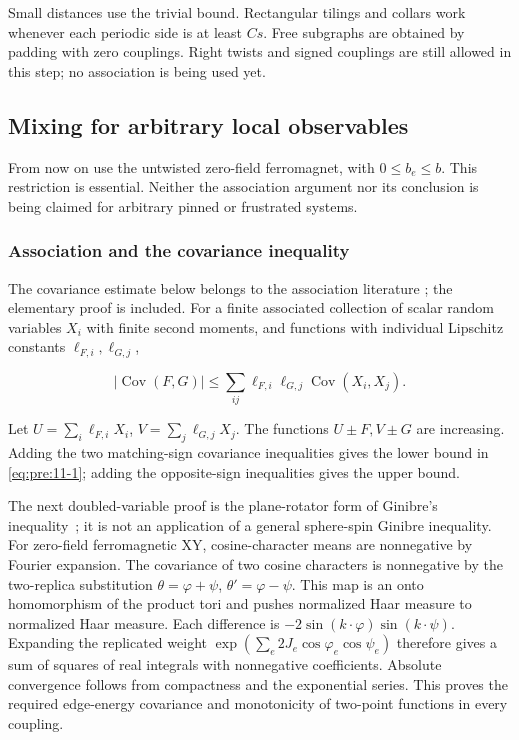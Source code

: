 Small distances use the trivial bound. Rectangular tilings and collars work whenever each periodic side is at least \(Cs\). Free subgraphs are obtained by padding with zero couplings. Right twists and signed couplings are still allowed in this step; no association is being used yet.


\subsection{Mixing for arbitrary local observables}\label{pre:neutral}

From now on use the untwisted zero-field ferromagnet, with \(0\leq b_e\leq b\). This restriction is essential. Neither the association argument nor its conclusion is being claimed for arbitrary pinned or frustrated systems.

\subsubsection{Association and the covariance inequality}\label{pre:part-11-1}

The covariance estimate below belongs to the association literature
\cite{Newman1980,BulinskiShabanovich1998}; the elementary proof is included.
For a finite associated collection of scalar random variables \(X_i\)
with finite second moments, and functions with individual Lipschitz
constants \(\ell_{F,i},\ell_{G,j}\),

\begin{equation}
|\operatorname{Cov}(F,G)|
\leq\sum_{ij}\ell_{F,i}\ell_{G,j}\operatorname{Cov}(X_i,X_j).
\label{eq:pre:11-1}
\end{equation}

Let \(U=\sum_i\ell_{F,i}X_i\), \(V=\sum_j\ell_{G,j}X_j\). The functions \(U\pm F,V\pm G\) are increasing. Adding the two matching-sign covariance inequalities gives the lower bound in \eqref{eq:pre:11-1}; adding the opposite-sign inequalities gives the upper bound.

The next doubled-variable proof is the plane-rotator form of Ginibre's
inequality~\cite{Ginibre1970}; it is not an application of a general
sphere-spin Ginibre inequality. For zero-field ferromagnetic XY, cosine-character means are nonnegative by Fourier expansion. The covariance of two cosine characters is nonnegative by the two-replica substitution \(\theta=\varphi+\psi\), \(\theta'=\varphi-\psi\). This map is an onto homomorphism of the product tori and pushes normalized Haar measure to normalized Haar measure. Each difference is
\(-2\sin(k\cdot\varphi)\sin(k\cdot\psi)\). Expanding the replicated weight
\(\exp(\sum_e2J_e\cos\varphi_e\cos\psi_e)\) therefore gives a sum of squares
of real integrals with nonnegative coefficients. Absolute convergence
follows from compactness and the exponential series. This proves the
required edge-energy covariance and monotonicity of two-point functions
in every coupling.

